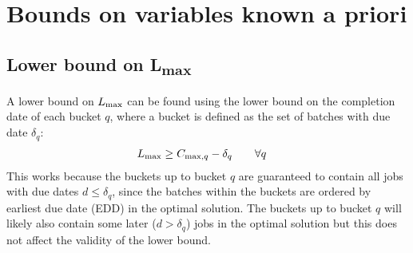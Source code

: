\section{Bounds on variables known a priori}

\subsection{Lower bound on {\sansitalicfont L}\textsubscript{max}}
A lower bound on $L_{\text{max}}$ can be found using the lower bound on the completion
date of each bucket $q$, where a bucket is defined as the set of batches with
due date $\delta_q$:
\begin{alignat}{2}
& L_{\text{max}} \geq C_{\text{max},q} - \delta_q \quad && \forall q
\end{alignat}
This works because the buckets up to bucket $q$ are guaranteed to contain all
jobs with due dates $d \leq \delta_q$, since the batches within the buckets are
ordered by earliest due date (EDD) in the optimal solution. The buckets up to
bucket $q$ will likely also contain some later ($d > \delta_q$) jobs in the
optimal solution but this does not affect the validity of the lower bound.

